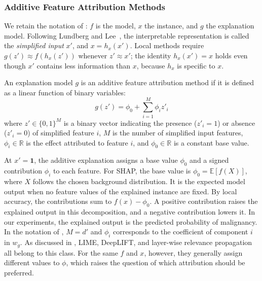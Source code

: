     \subsubsection{Additive Feature Attribution Methods}
    We retain the notation of : $f$ is the model, $x$ the instance, and $g$ the explanation model. Following Lundberg and Lee~\cite{NIPS2017_8a20a862}, the interpretable representation is called the \textit{simplified input} $x'$, and $x = h_x(x')$. Local methods require $g(z') \approx f(h_x(z'))$ whenever $z' \approx x'$; the identity $h_x(x') = x$ holds even though $x'$ contains less information than $x$, because $h_x$ is specific to $x$.

    \begin{definition}
    \label{def:additive-attribution}
    An explanation model $g$ is an additive feature attribution method if it is defined as a linear function of binary variables:
    \begin{equation}
        g(z') = \phi_0 + \sum_{i=1}^M \phi_i z'_i
        \label{eq:shap-additive}
    \end{equation}
    where $z' \in \{0, 1\}^M$ is a binary vector indicating the presence ($z'_i = 1$) or absence ($z'_i = 0$) of simplified feature $i$, $M$ is the number of simplified input features, $\phi_i \in \mathbb{R}$ is the effect attributed to feature $i$, and $\phi_0 \in \mathbb{R}$ is a constant base value.
    \end{definition}

    At $x' = \mathbf{1}$, the additive explanation assigns a base value $\phi_0$ and a signed contribution $\phi_i$ to each feature. For SHAP, the base value is $\phi_0 = \mathbb{E}[f(X)]$, where $X$ follows the chosen background distribution. It is the expected model output when no feature values of the explained instance are fixed. By local accuracy, the contributions sum to $f(x) - \phi_0$. A positive contribution raises the explained output in this decomposition, and a negative contribution lowers it. In our experiments, the explained output is the predicted probability of malignancy. In the notation of , $M = d'$ and $\phi_i$ corresponds to the coefficient of component $i$ in $w_g$. As discussed in , LIME, DeepLIFT, and layer-wise relevance propagation all belong to this class. For the same $f$ and $x$, however, they generally assign different values to $\phi$, which raises the question of which attribution should be preferred.

